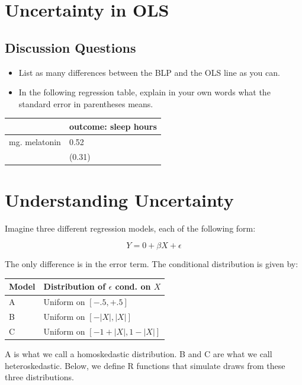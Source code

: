\documentclass[
]{book}
\providecommand{\tightlist}{%
  \setlength{\itemsep}{0pt}\setlength{\parskip}{0pt}}
\theoremstyle{definition}
\theoremstyle{definition}
\theoremstyle{definition}
\theoremstyle{definition}
\theoremstyle{remark}
\begin{document}
\hypertarget{uncertainty-in-ols}{%
\section{Uncertainty in OLS}\label{uncertainty-in-ols}}

\hypertarget{discussion-questions-1}{%
\subsection{Discussion Questions}\label{discussion-questions-1}}

\begin{itemize}
\tightlist
\item
  List as many differences between the BLP and the OLS line as you can.
\item
  In the following regression table, explain in your own words what the standard error in parentheses means.
\end{itemize}

\begin{longtable}[]{@{}ll@{}}
\toprule
& outcome: sleep hours \\
\midrule
\endhead
mg. melatonin & 0.52 \\
& (0.31) \\
\bottomrule
\end{longtable}

\hypertarget{understanding-uncertainty}{%
\section{Understanding Uncertainty}\label{understanding-uncertainty}}

Imagine three different regression models, each of the following form:

\[
  Y = 0 + \beta X + \epsilon
\]

The only difference is in the error term. The conditional distribution is given by:

\begin{longtable}[]{@{}ll@{}}
\toprule
Model & Distribution of \(\epsilon\) cond. on \(X\) \\
\midrule
\endhead
A & Uniform on \([-.5, +.5]\) \\
B & Uniform on \([ - |X|, |X| ]\) \\
C & Uniform on \([ -1 + |X|, 1- |X| ]\) \\
\bottomrule
\end{longtable}

A is what we call a homoskedastic distribution. B and C are what we call heteroskedastic. Below, we define R functions that simulate draws from these three distributions.
\end{document}
